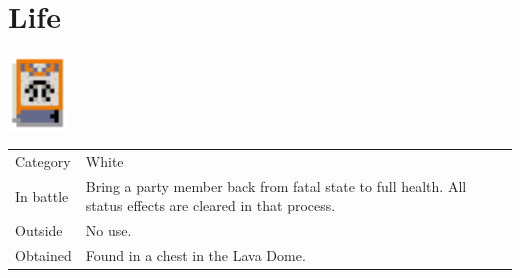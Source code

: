 \section{Life}
\label{spell:life}

\includegraphics[height=2cm,keepaspectratio]{./resources/spells/life}

\begin{longtable}{ l p{9cm} }
	Category
	& White
\\ %
	In battle
	& Bring a party member back from fatal state to full health. All status effects are cleared in that process.
\\ %
	Outside
	& No use.
\\ %
	Obtained
	& Found in a chest in the Lava Dome.
\end{longtable}
